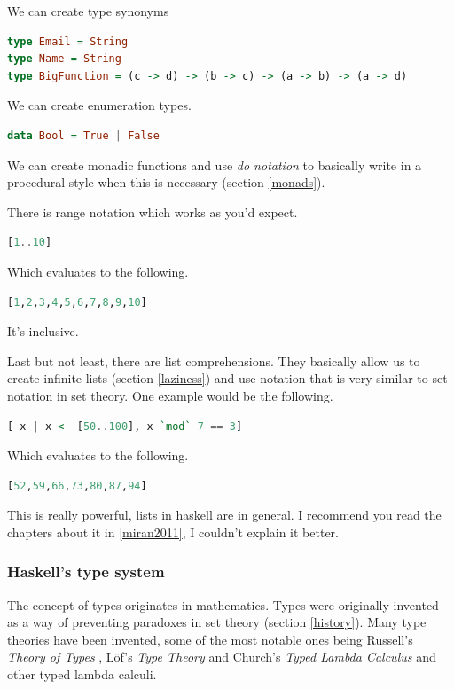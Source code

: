 \documentclass[11pt]{article}
\begin{document}
We can create type synonyms
\begin{lstlisting}[language=Haskell]
type Email = String
type Name = String
type BigFunction = (c -> d) -> (b -> c) -> (a -> b) -> (a -> d)
\end{lstlisting}

We can create enumeration types.
\begin{lstlisting}[language=Haskell]
data Bool = True | False
\end{lstlisting}

We can create monadic functions and use \emph{do notation} to basically write
in a procedural style when this is necessary (section \ref{monads}).

There is range notation which works as you'd expect.
\begin{lstlisting}[language=Haskell]
[1..10]
\end{lstlisting}
Which evaluates to the following.
\begin{lstlisting}[language=Haskell]
[1,2,3,4,5,6,7,8,9,10]
\end{lstlisting}
It's inclusive.

Last but not least, there are list comprehensions. They basically allow us to
create infinite lists (section \ref{laziness}) and use notation that is very
similar to set notation in set theory. One example would be the following.
\begin{lstlisting}[language=Haskell]
[ x | x <- [50..100], x `mod` 7 == 3]
\end{lstlisting}
Which evaluates to the following.
\begin{lstlisting}[language=Haskell]
[52,59,66,73,80,87,94]
\end{lstlisting}
This is really powerful, lists in haskell are in general. I recommend you read
the chapters about it in \ref{miran2011}, I couldn't explain it better.

\subsubsection{Haskell's type system}\label{types}

The concept of types originates in mathematics. Types were originally invented
as a way of preventing paradoxes in set theory (section \ref{history}). Many
type theories have been invented, some of the most notable ones being Russell's
\emph{Theory of Types} \parencite{russell1903}, Löf's \emph{Type Theory}
\parencite{lof1984} and Church's \emph{Typed Lambda Calculus}
\parencite{church1940} and other typed lambda calculi.
\end{document}

